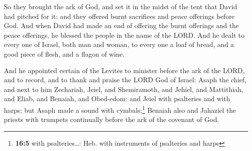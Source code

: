  So they brought the ark of God, and set it in the midst
of the tent that David had pitched for it: and they offered burnt
sacrifices and peace offerings before God.  And when David
had made an end of offering the burnt offerings and the peace offerings,
he blessed the people in the name of the LORD.  And he
dealt to every one of Israel, both man and woman, to every one a loaf of
bread, and a good piece of flesh, and a flagon of wine.

 And he appointed certain of the Levites to minister
before the ark of the LORD, and to record, and to thank and praise the
LORD God of Israel:  Asaph the chief, and next to him
Zechariah, Jeiel, and Shemiramoth, and Jehiel, and Mattithiah, and
Eliab, and Benaiah, and Obed-edom: and Jeiel with psalteries and with
harps; but Asaph made a sound with cymbals;\footnote{\textbf{16:5} with
  psalteries\ldots: Heb. with instruments of psalteries and harps}
 Benaiah also and Jahaziel the priests with trumpets
continually before the ark of the covenant of God.

